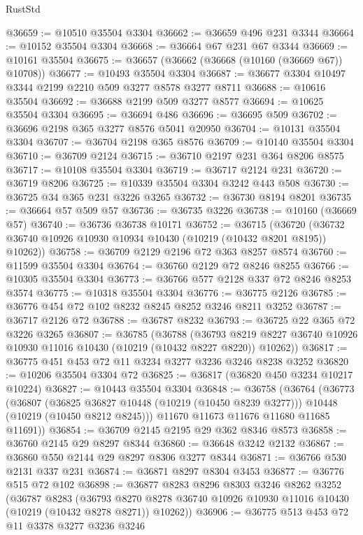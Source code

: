 \begin{lexlean}{RustStd}
\begin{coremodule}
@36659 := @10510 @35504 @3304
@36662 := @36659 @496 @231 @3344
@36664 := @10152 @35504 @3304
@36668 := @36664 @67 @231 @67 @3344
@36669 := @10161 @35504
@36675 := @36657 (@36662 (@36668 (@10160 (@36669 @67)) @10708))
@36677 := @10493 @35504 @3304
@36687 := @36677 @3304 @10497 @3344 @2199 @2210 @509 @3277 @8578 @3277 @8711
@36688 := @10616 @35504
@36692 := @36688 @2199 @509 @3277 @8577
@36694 := @10625 @35504 @3304
@36695 := @36694 @486
@36696 := @36695 @509
@36702 := @36696 @2198 @365 @3277 @8576 @5041 @20950
@36704 := @10131 @35504 @3304
@36707 := @36704 @2198 @365 @8576
@36709 := @10140 @35504 @3304
@36710 := @36709 @2124
@36715 := @36710 @2197 @231 @364 @8206 @8575
@36717 := @10108 @35504 @3304
@36719 := @36717 @2124 @231
@36720 := @36719 @8206
@36725 := @10339 @35504 @3304 @3242 @443 @508
@36730 := @36725 @34 @365 @231 @3226 @3265
@36732 := @36730 @8194 @8201
@36735 := @36664 @57 @509 @57
@36736 := @36735 @3226
@36738 := @10160 (@36669 @57)
@36740 := @36736 @36738 @10171
@36752 := @36715
    (@36720 (@36732 @36740 @10926 @10930 @10934 @10430 (@10219 (@10432 @8201 @8195)) @10262))
@36758 := @36709 @2129 @2196 @72 @363 @8257 @8574
@36760 := @11599 @35504 @3304
@36764 := @36760 @2129 @72 @8246 @8255
@36766 := @10305 @35504 @3304
@36773 := @36766 @577 @2128 @337 @72 @8246 @8253 @3574
@36775 := @10318 @35504 @3304
@36776 := @36775 @2126
@36785 := @36776 @454 @72 @102 @8232 @8245 @8252 @3246 @8211 @3252
@36787 := @36717 @2126 @72
@36788 := @36787 @8232
@36793 := @36725 @22 @365 @72 @3226 @3265
@36807 := @36785
    (@36788
      (@36793 @8219 @8227 @36740 @10926 @10930 @11016 @10430 (@10219 (@10432 @8227 @8220)) @10262))
@36817 := @36775 @451 @453 @72 @11 @3234 @3277 @3236 @3246 @8238 @3252
@36820 := @10206 @35504 @3304 @72
@36825 := @36817 (@36820 @450 @3234 @10217 @10224)
@36827 := @10443 @35504 @3304
@36848 := @36758
    (@36764
      (@36773
        (@36807
          (@36825 @36827 @10448 (@10219 (@10450 @8239 @3277)))
          @10448
          (@10219 (@10450 @8212 @8245)))
        @11670
        @11673
        @11676
        @11680
        @11685
        @11691))
@36854 := @36709 @2145 @2195 @29 @362 @8346 @8573
@36858 := @36760 @2145 @29 @8297 @8344
@36860 := @36648 @3242 @2132
@36867 := @36860 @550 @2144 @29 @8297 @8306 @3277 @8344
@36871 := @36766 @530 @2131 @337 @231
@36874 := @36871 @8297 @8304 @3453
@36877 := @36776 @515 @72 @102
@36898 := @36877
    @8283
    @8296
    @8303
    @3246
    @8262
    @3252
    (@36787
      @8283
      (@36793 @8270 @8278 @36740 @10926 @10930 @11016 @10430 (@10219 (@10432 @8278 @8271)) @10262))
@36906 := @36775 @513 @453 @72 @11 @3378 @3277 @3236 @3246

\end{coremodule}
\end{lexlean}
